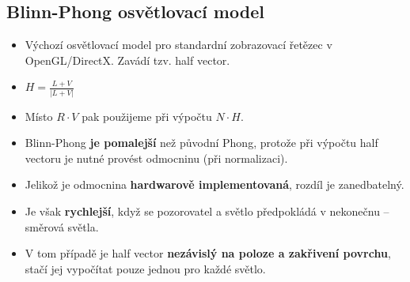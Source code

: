 \subsection*{Blinn-Phong osvětlovací model}
\begin{itemize}
	\item Výchozí osvětlovací model pro standardní zobrazovací řetězec v OpenGL/DirectX. Zavádí tzv. half vector.
	\item $ H = \frac{L + V}{| L + V |}$
	\item Místo $R \cdot V$  pak použijeme při výpočtu $N \cdot H$.
	\item Blinn-Phong \textbf{je pomalejší} než původní Phong, protože při výpočtu half vectoru je nutné provést odmocninu (při normalizaci).
	\item Jelikož je odmocnina \textbf{hardwarově implementovaná}, rozdíl je zanedbatelný.
	\item Je však \textbf{rychlejší}, když se pozorovatel a světlo předpokládá v nekonečnu -- směrová světla.
	\item V tom případě je half vector \textbf{nezávislý na poloze a zakřivení povrchu}, stačí jej vypočítat pouze jednou pro každé světlo.
\end{itemize}

